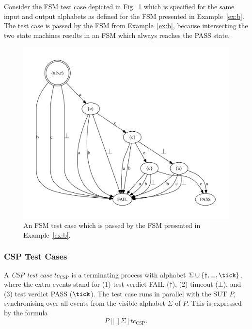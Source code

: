 \begin{example}
Consider the FSM test case depicted in Fig.~\ref{fig:fsm0tc} which is specified
for the same input and output alphabets as defined for  the FSM presented in Example~\ref{ex:b}. The test case is passed by the FSM from Example~\ref{ex:b}, because 
intersecting the two state machines results in an FSM which always reaches the PASS state.
\xbox
\end{example}


 \begin{figure}
 \begin{center}
\includegraphics[width=.8\textwidth]{fsm0tc.pdf}
\end{center}
\caption{An FSM test case which is passed by the FSM presented in Example~\ref{ex:b}.}
 \label{fig:fsm0tc}
 \end{figure}

 


\subsubsection*{CSP Test Cases}
A \emph{CSP test case} $tc_\text{CSP}$  is a terminating process with alphabet 
$\Sigma\cup\{\dag,\bot,\tick \}$, where the extra events stand for 
(1) test  verdict FAIL ($\dag$), (2) timeout ($\bot$), and (3) test 
 verdict PASS ($\tick$). The test case runs in parallel with the SUT $P$,
 synchronising over all events from the visible alphabet $\Sigma$ of $P$. This is 
 expressed by the formula
 $$
 P\parallel[\Sigma] tc_\text{CSP}.
 $$
 
